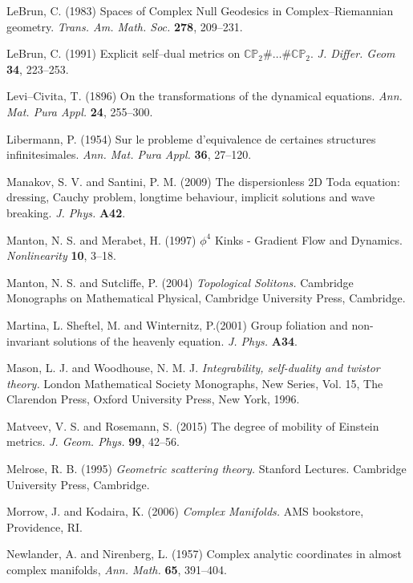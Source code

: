 \begin{thebibliography}{}
 LeBrun, C. (1983)
Spaces of Complex Null Geodesics in Complex--Riemannian geometry. \textit{Trans. Am. Math. Soc.} {\bf 278}, 209--231.

 LeBrun, C. (1991)
Explicit self--dual metrics on $\mathbb{CP}_2\#\dots \#\mathbb{CP}_2$.
\textit{J. Differ. Geom} {\bf 34}, 223--253.


 Levi--Civita, T. (1896) On the transformations of the 
dynamical equations. \textit{Ann. Mat. Pura Appl.} {\bf 24}, 255--300.

Libermann, P. (1954) Sur le probleme d'equivalence de certaines structures infinitesimales. \textit{Ann.
Mat. Pura Appl.} {\bf 36}, 27--120.

 Manakov, S. V. and Santini, P. M. (2009)
The dispersionless 2D Toda equation: dressing, Cauchy problem, longtime behaviour, implicit solutions and wave breaking. \textit{J. Phys.} {\bf A42}.

 Manton, N. S. and Merabet, H. (1997)
$\phi^4$ Kinks - Gradient Flow and Dynamics. \textit{Nonlinearity} {\bf 10}, 3--18.

 Manton, N. S. and Sutcliffe, P. (2004)
\textit{Topological Solitons.} Cambridge Monographs on Mathematical Physical, Cambridge University Press, Cambridge.

Martina, L. Sheftel, M. and Winternitz, P.(2001)
Group foliation and non-invariant
solutions of the heavenly equation.
\textit{J. Phys.} {\bf A34}.

 Mason, L. J. and Woodhouse, N. M. J.  \textit{Integrability, self-duality and twistor theory.} London Mathematical Society Monographs, New Series, Vol. 15, The Clarendon Press, Oxford University Press, New York, 1996.

 Matveev, V. S. and Rosemann, S. (2015)
The degree of mobility of Einstein metrics. \textit{J. Geom. Phys.}
{\bf 99}, 42--56.


Melrose, R. B. (1995)
{\em Geometric scattering theory.} Stanford Lectures. Cambridge University Press,
Cambridge.

 Morrow, J. and Kodaira, K. (2006)
\textit{Complex Manifolds.} AMS bookstore, Providence, RI.

 Newlander, A. and Nirenberg, L. (1957)
Complex analytic coordinates in almost complex manifolds, \textit{Ann. Math.} {\bf 65}, 391--404.


\end{thebibliography}
